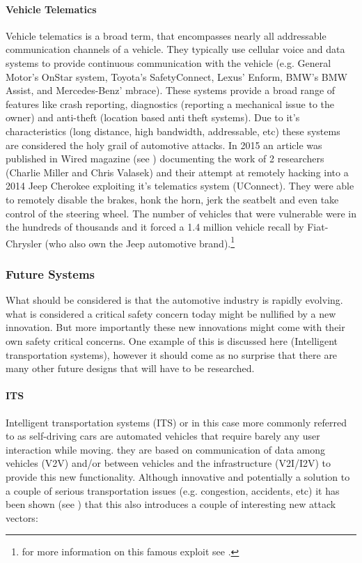 \documentclass[11pt]{article}
\begin{document}
\paragraph{Vehicle Telematics} Vehicle telematics is a broad term, that encompasses nearly all addressable communication channels of a vehicle. They typically use cellular voice and data systems to provide continuous communication with the vehicle (e.g. General Motor's OnStar system, Toyota’s SafetyConnect, Lexus’ Enform, BMW’s BMW Assist, and Mercedes-Benz’ mbrace). These systems provide a broad range of features like crash reporting, diagnostics (reporting a mechanical issue to the owner) and anti-theft (location based anti theft systems)\cite{Kosher}. Due to it's characteristics (long distance, high bandwidth, addressable, etc) these systems are considered the holy grail of automotive attacks\cite{MillerA}. In 2015 an article was published in Wired magazine (see \cite{Wired}) documenting the work of 2 researchers (Charlie Miller and Chris Valasek) and their attempt at remotely hacking into a 2014 Jeep Cherokee exploiting it's telematics system (UConnect). They were able to remotely disable the brakes, honk the horn, jerk the seatbelt and even take control of the steering wheel\cite{Wired}. The number of vehicles that were vulnerable were in the hundreds of thousands and it forced a 1.4 million vehicle recall by Fiat-Chrysler (who also own the Jeep automotive brand).\footnote{for more information on this famous exploit see \cite{MillerD}.}

\subsubsection{Future Systems}
What should be considered is that the automotive industry is rapidly evolving. what is considered a critical safety concern today might be nullified by a new innovation. But more importantly these new innovations might come with their own safety critical concerns. One example of this is discussed here (Intelligent transportation systems), however it should come as no surprise that there are many other future designs that will have to be researched.

\paragraph{ITS} Intelligent transportation systems (ITS) or in this case more commonly referred to as self-driving cars are automated vehicles that require barely any user interaction while moving. they are based on communication of data among vehicles (V2V) and/or between vehicles and the infrastructure (V2I/I2V) to provide this new functionality. Although innovative and potentially a solution to a couple of serious transportation issues (e.g. congestion, accidents, etc) it has been shown (see \cite{Petit}) that this also introduces a couple of interesting new attack vectors:   
\end{document}
